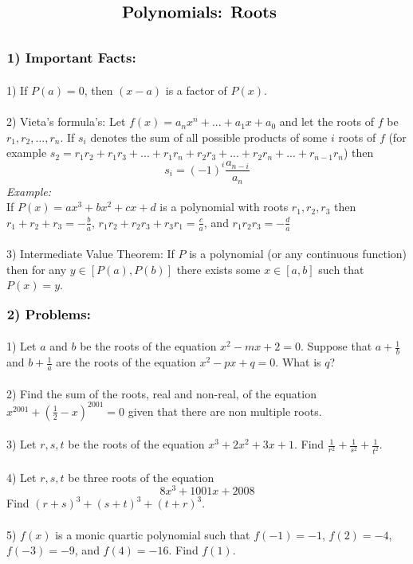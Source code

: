 \documentclass{article}
\begin{document}
$\centerline{\Large \textbf{Polynomials: Roots}}$
\\
\\
\\
$\large \textbf{1)  Important Facts:}$  \\
\\
1) If $P(a)=0$, then $(x-a)$ is a factor of $P(x)$.
\\
\\
2) Vieta's formula's: Let $f(x)=a_nx^n+...+a_1x+a_0$ and let the roots of $f$ be $r_1,r_2,...,r_n$. If $s_i$ denotes the sum of all possible products of some $i$ roots of $f$ (for example $s_2=r_1r_2+r_1r_3+...+r_1r_n+r_2r_3+...+r_2r_n+...+r_{n-1}r_n$) then
\begin{equation}
s_i=(-1)^i\frac{a_{n-i}}{a_n}
\end{equation} 
\textit{Example:}\\
If $P(x)=ax^3+bx^2+cx+d$ is a polynomial with roots $r_1,r_2,r_3$ then $r_1+r_2+r_3=-\frac{b}{a}$,  $r_1r_2+r_2r_3+r_3r_1=\frac{c}{a}$, and $r_1r_2r_3=-\frac{d}{a}$
\\
\\
3) Intermediate Value Theorem: If $P$ is a polynomial (or any continuous function) then for any $y\in[P(a),P(b)]$ there exists some $x\in[a,b]$ such that $P(x)=y$.
\\
\\
$\large \textbf{2)  Problems:}$  \\
\\
1) Let $a$ and $b$ be the roots of the equation $x^2-mx+2=0$. Suppose that $a+\frac{1}{b}$ and $b+\frac{1}{a}$ are the roots of the equation $x^2-px+q=0$. What is $q$?
\\
\\
2) Find the sum of the roots, real and non-real, of the equation $x^{2001}+(\frac{1}{2}-x)^{2001}=0$ given that there are non multiple roots.
\\
\\
3) Let $r,s,t$ be the roots of the equation $x^3+2x^2+3x+1$. Find
$\frac{1}{r^2}+\frac{1}{s^2}+\frac{1}{t^2}$.
\\
\\
4) Let $r,s,t$ be three roots of the equation
\begin{equation*}
8x^3+1001x+2008
\end{equation*}
Find $(r+s)^3+(s+t)^3+(t+r)^3$.
\\
\\
5) $f(x)$ is a monic quartic polynomial such that $f(-1)=-1$, $f(2)=-4$, $f(-3)=-9$, and $f(4)=-16$. Find $f(1)$.
\end{document}
